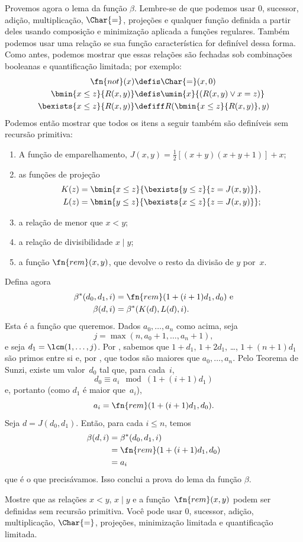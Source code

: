 \documentclass[../../../include/open-logic-section]{subfiles}
\begin{document}
Provemos agora o lema da função $\beta$. Lembre-se de que podemos usar
$0$, sucessor, adição, multiplicação, $\Char{=}$, projeções e qualquer
função definida a partir deles usando composição e minimização aplicada
a funções regulares. Também podemos usar uma relação se sua função
característica for definível dessa forma. Como antes, podemos mostrar
que essas relações são fechadas sob combinações booleanas e
quantificação limitada; por exemplo:
\begin{align*}
\fn{not}(x) & \defis \Char{=}(x,0)\\
\bmin{x \leq z}{R(x,y)} & \defis \umin{x}{(R(x,y) \lor x = z)}\\
\bexists{x \leq z}{R(x,y)} & \defiff R(\bmin{x \leq z}{R(x,y)}, y)
\end{align*}
Podemos então mostrar que todos os itens a seguir também são definíveis
sem recursão primitiva:
\begin{enumerate}
\item A função de emparelhamento,
  $J(x,y) = \frac{1}{2}[(x+y)(x+y+1)] + x$;
\item as funções de projeção
\begin{align*}
K(z) & = \bmin{x \leq z}{\bexists{y \leq z}{z = J(x,y)}},\\
L(z) & = \bmin{y \leq z}{\bexists{x \leq z}{z = J(x,y)}};
\end{align*}
\item a relação de menor que $x < y$;
\item a relação de divisibilidade $x \mid y$;
\item a função $\fn{rem}(x,y)$, que devolve o resto da divisão de $y$
  por~$x$.
\end{enumerate}
Defina agora
\begin{align*}
\beta^*(d_0,d_1,i) & = \fn{rem}(1+(i+1) d_1,d_0) \text{ e}\\
\beta(d,i) & = \beta^*(K(d),L(d),i).
\end{align*}
Esta é a função que queremos. Dados $a_0,\dots,a_n$ como acima, seja
\[
j = \max(n,a_0+1,\dots,a_n+1),
\]
e seja $d_1 = \lcm(1,\dots,j)$. Por , sabemos que
$1+d_1$, $1+2 d_1$, \dots, $1+(n+1) d_1$ são primos entre si e, por
, que todos são maiores que $a_0,\dots,a_n$. Pelo Teorema
de Sunzi, existe um valor~$d_0$ tal que, para cada~$i$,
\[
d_0 \equiv a_i \mod (1+(i+1)d_1)
\]
e, portanto (como $d_1$ é maior que~$a_i$),
\[
a_i = \fn{rem}(1+(i+1)d_1,d_0).
\]
Seja $d = J(d_0,d_1)$. Então, para cada $i \le n$, temos
\begin{align*}
\beta(d,i) & =  \beta^*(d_0,d_1,i) \\
& =  \fn{rem}(1+(i+1) d_1,d_0) \\
& =  a_i
\end{align*}
que é o que precisávamos. Isso conclui a prova do lema da função
$\beta$.

\begin{prob}
  Mostre que as relações $x < y$, $x \mid y$ e a
  função~$\fn{rem}(x,y)$ podem ser definidas sem recursão primitiva.
  Você pode usar $0$, sucessor, adição, multiplicação, $\Char{=}$,
  projeções, minimização limitada e quantificação limitada.
\end{prob}
\end{document}
